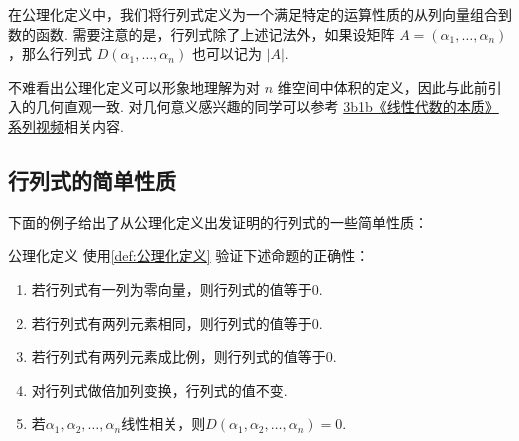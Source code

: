 在公理化定义中，我们将行列式定义为一个满足特定的运算性质的从列向量组合到数的函数. 需要注意的是，行列式除了上述记法外，如果设矩阵 $A = (\alpha_1,\ldots,\alpha_n)$，那么行列式 $D(\alpha_1,\ldots,\alpha_n)$ 也可以记为 $|A|$.

不难看出公理化定义可以形象地理解为对 $n$ 维空间中体积的定义，因此与此前引入的几何直观一致. 对几何意义感兴趣的同学可以参考 \href{https://b23.tv/BV1ys411472E}{3b1b《线性代数的本质》系列视频}相关内容.

\subsection{行列式的简单性质}

下面的例子给出了从公理化定义出发证明的行列式的一些简单性质：

\begin{example}{}{公理化定义}
    使用\autoref{def:公理化定义} 验证下述命题的正确性：
    \begin{enumerate}
        \item 若行列式有一列为零向量，则行列式的值等于0.

        \item 若行列式有两列元素相同，则行列式的值等于0.

        \item 若行列式有两列元素成比例，则行列式的值等于0.

        \item 对行列式做倍加列变换，行列式的值不变.

        \item \label{item:13:公理化定义导出性质:5}
            若$\alpha_1,\alpha_2,\ldots,\alpha_n$线性相关，则$D(\alpha_1,\alpha_2,\ldots,\alpha_n)=0$.
    \end{enumerate}
\end{example}

